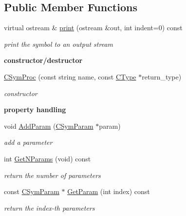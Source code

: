 \subsection*{Public Member Functions}
\begin{DoxyCompactItemize}
\item 
virtual ostream \& \hyperlink{classCSymProc_a017592961bb61fc763b4929bc9a87ed2}{print} (ostream \&out, int indent=0) const 
\begin{DoxyCompactList}\small\item\em print the symbol to an output stream \end{DoxyCompactList}\end{DoxyCompactItemize}
\begin{Indent}{\bf constructor/destructor}\par
\begin{DoxyCompactItemize}
\item 
\hyperlink{classCSymProc_a081bbe9fae7be311692435b89eb6d823}{C\-Sym\-Proc} (const string name, const \hyperlink{classCType}{C\-Type} $\ast$return\-\_\-type)
\begin{DoxyCompactList}\small\item\em constructor \end{DoxyCompactList}\end{DoxyCompactItemize}
\end{Indent}
\begin{Indent}{\bf property handling}\par
\begin{DoxyCompactItemize}
\item 
void \hyperlink{classCSymProc_a9ebd055fd4b087ef7934e625969f3e7a}{Add\-Param} (\hyperlink{classCSymParam}{C\-Sym\-Param} $\ast$param)
\begin{DoxyCompactList}\small\item\em add a parameter \end{DoxyCompactList}\item 
int \hyperlink{classCSymProc_a8dd280fcfd6fe8b898658bbd0a75869c}{Get\-N\-Params} (void) const 
\begin{DoxyCompactList}\small\item\em return the number of parameters \end{DoxyCompactList}\item 
const \hyperlink{classCSymParam}{C\-Sym\-Param} $\ast$ \hyperlink{classCSymProc_ade390a61073b6176f84f4bb4d79012eb}{Get\-Param} (int index) const 
\begin{DoxyCompactList}\small\item\em return the {\itshape index-\/th} parameters \end{DoxyCompactList}\end{DoxyCompactItemize}
\end{Indent}


